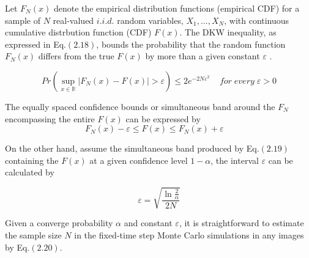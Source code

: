 Let $F_N(x)$ denote the empirical distribution functions (empirical
CDF) for a sample of $N$ real-valued $i.i.d.$ random variables,
$X_{1}, ... , X_{N}$, with continuous cumulative distrbution function
(CDF) $F(x)$. The DKW inequality, as expressed in Eq.$(2.18)$, bounds the
probability that the random function $F_{N}(x)$ differs from the true
$F(x)$ by more than a given constant $\varepsilon$
\cite{dvoretzky1956asymptotic}.

\begin{equation}
  Pr(\sup_{x \in \mathbb{R}} |F_{N}(x) - F(x)| > \varepsilon) \leq
  2e^{-2N\varepsilon^2} \;\; \;\; for \; every \; \varepsilon > 0
\end{equation}

The equally spaced confidence bounds or simultaneous band around the
$F_{N}$ encompassing the entire $F(x)$ can be expressed by
\begin{equation}
  F_{N}(x) - \varepsilon \leq F(x) \leq F_N(x) + \varepsilon \; \; \; \; 
\end{equation}

On the other hand, assume the simultaneous band produced by Eq.$(2.19)$
containing the $F(x)$ at a given confidence level $1-\alpha$, the
interval $\varepsilon$ can be calculated by

\begin{equation}
  \varepsilon = \sqrt{\frac{\ln{\frac{2}{\alpha}}}{2N}}
\end{equation}


Given a converge probability $\alpha$ and constant $\varepsilon$, it is
straightforward to estimate the sample size $N$ in the fixed-time step
Monte Carlo simulations in any images by Eq.$(2.20)$.

